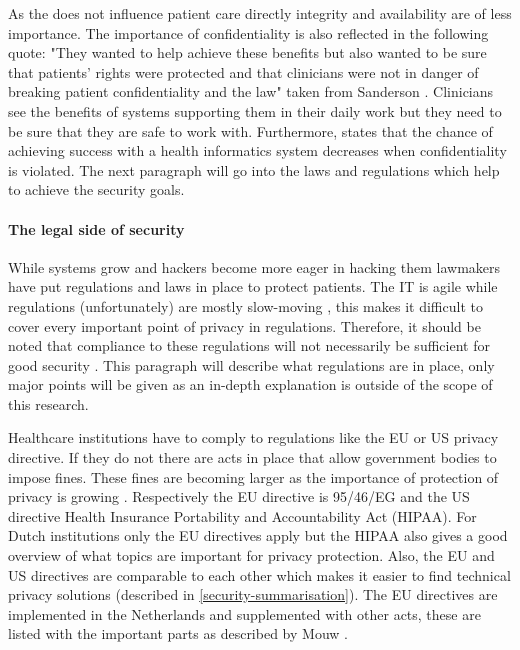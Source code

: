 As the \ivfsystem{} does not influence patient care directly integrity and availability are of less importance.
The importance of confidentiality is also reflected in the following quote: "They wanted to help achieve these benefits but also wanted to be sure that patients' rights were protected and that clinicians were not in danger of breaking patient confidentiality and the law" taken from Sanderson \cite{s5Sanderson2004}.
Clinicians see the benefits of systems supporting them in their daily work but they need to be sure that they are safe to work with.
Furthermore, \cite{s4Layman2008} states that the chance of achieving success with a health informatics system decreases when confidentiality is violated.
The next paragraph will go into the laws and regulations which help to achieve the security goals.

\paragraph{The legal side of security}
\label{security-legal}

While systems grow and hackers become more eager in hacking them lawmakers have put regulations and laws in place to protect patients.
The IT is agile while regulations (unfortunately) are mostly slow-moving \cite{s20Groves2013}, this makes it difficult to cover every important point of privacy in regulations.
Therefore, it should be noted that compliance to these regulations will not necessarily be sufficient for good security \cite{s20Groves2013}.
This paragraph will describe what regulations are in place, only major points will be given as an in-depth explanation is outside of the scope of this research.

Healthcare institutions have to comply to regulations like the EU or US privacy directive.
If they do not there are acts in place that allow government bodies to impose fines.
These fines are becoming larger as the importance of protection of privacy is growing \cite{s1Zamosky2014}.
Respectively the EU directive is 95/46/EG and the US directive Health Insurance Portability and Accountability Act (HIPAA).
For Dutch institutions only the EU directives apply but the HIPAA also gives a good overview of what topics are important for privacy protection.
Also, the EU and US directives are comparable to each other which makes it easier to find technical privacy solutions (described in \ref{security-summarisation}).
The EU directives are implemented in the Netherlands and supplemented with other acts, these are listed with the important parts as described by Mouw \cite{s19Mouw2012}.

